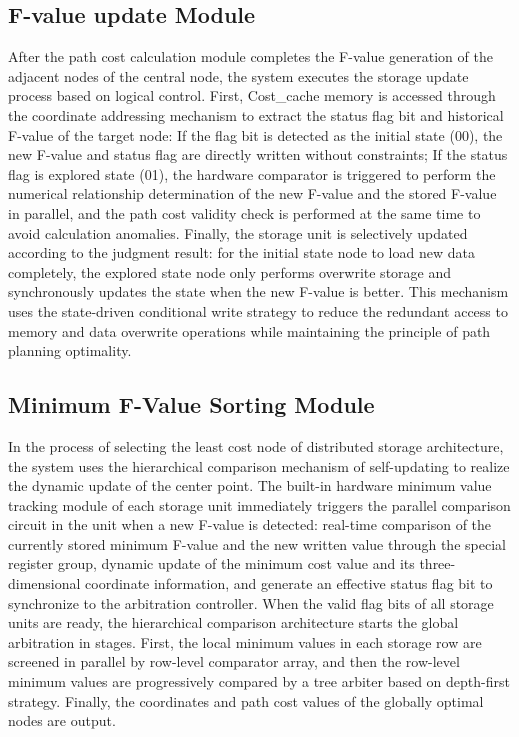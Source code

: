 \subsection{F-value update Module}
After the path cost calculation module completes the F-value generation of the adjacent nodes of the central node, the system executes the storage update process based on logical control.
First, Cost\_cache memory is accessed through the coordinate addressing mechanism to extract the status flag bit and historical F-value of the target node: If the flag bit is detected as the initial state (00), the new F-value and status flag are directly written without constraints;
If the status flag is explored state (01), the hardware comparator is triggered to perform the numerical relationship determination of the new F-value and the stored F-value in parallel, and the path cost validity check is performed at the same time to avoid calculation anomalies.
Finally, the storage unit is selectively updated according to the judgment result: for the initial state node to load new data completely, the explored state node only performs overwrite storage and synchronously updates the state when the new F-value is better.
This mechanism uses the state-driven conditional write strategy to reduce the redundant access to memory and data overwrite operations while maintaining the principle of path planning optimality.

\subsection{Minimum F-Value Sorting Module}
In the process of selecting the least cost node of distributed storage architecture, the system uses the hierarchical comparison mechanism of self-updating to realize the dynamic update of the center point.
The built-in hardware minimum value tracking module of each storage unit immediately triggers the parallel comparison circuit in the unit when a new F-value is detected: real-time comparison of the currently stored minimum F-value and the new written value through the special register group, dynamic update of the minimum cost value and its three-dimensional coordinate information, and generate an effective status flag bit to synchronize to the arbitration controller.
When the valid flag bits of all storage units are ready, the hierarchical comparison architecture starts the global arbitration in stages. First, the local minimum values in each storage row are screened in parallel by row-level comparator array, and then the row-level minimum values are progressively compared by a tree arbiter based on depth-first strategy. Finally, the coordinates and path cost values of the globally optimal nodes are output.

